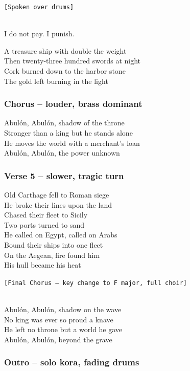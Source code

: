 \texttt{{[}Spoken\ over\ drums{]}}\strut \\
I do not pay. I punish.

A treasure ship with double the weight\\
Then twenty-three hundred swords at night\\
Cork burned down to the harbor stone\\
The gold left burning in the light

\subsubsection{Chorus -- louder, brass
dominant}\label{chorus-louder-brass-dominant}

Abulón, Abulón, shadow of the throne\\
Stronger than a king but he stands alone\\
He moves the world with a merchant's loan\\
Abulón, Abulón, the power unknown

\subsubsection{Verse 5 -- slower, tragic
turn}\label{verse-5-slower-tragic-turn}

Old Carthage fell to Roman siege\\
He broke their lines upon the land\\
Chased their fleet to Sicily\\
Two ports turned to sand\\
He called on Egypt, called on Arabs\\
Bound their ships into one fleet\\
On the Aegean, fire found him\\
His hull became his heat

\texttt{{[}Final\ Chorus\ –\ key\ change\ to\ F\ major,\ full\ choir{]}}\strut \\
Abulón, Abulón, shadow on the wave\\
No king was ever so proud a knave\\
He left no throne but a world he gave\\
Abulón, Abulón, beyond the grave

\subsubsection{Outro -- solo kora, fading
drums}\label{outro-solo-kora-fading-drums}

